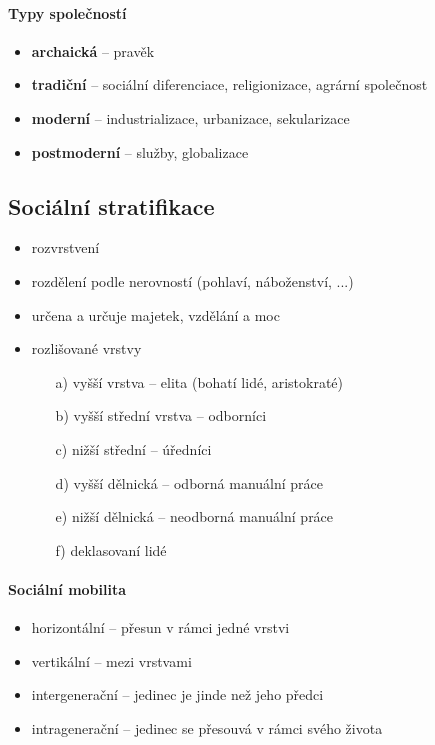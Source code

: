 \paragraph{Typy společností}
\begin{itemize}
\item \textbf{archaická} -- pravěk
\item \textbf{tradiční} -- sociální diferenciace, religionizace, agrární společnost
\item \textbf{moderní} -- industrializace, urbanizace, sekularizace
\item \textbf{postmoderní} -- služby, globalizace
\end{itemize}

\subsection{Sociální stratifikace}
\begin{itemize}
\item rozvrstvení
\item rozdělení podle nerovností (pohlaví, náboženství, ...)
\item určena a určuje majetek, vzdělání a moc
\item rozlišované vrstvy
	\begin{itemize}
	\item[a)] vyšší vrstva -- elita (bohatí lidé, aristokraté)
	\item[b)] vyšší střední vrstva -- odborníci
	\item[c)] nižší střední -- úředníci
	\item[d)] vyšší dělnická -- odborná manuální práce
	\item[e)] nižší dělnická -- neodborná manuální práce
	\item[f)] deklasovaní lidé
	\end{itemize}
\end{itemize}

\paragraph{Sociální mobilita}
\begin{itemize}
\item horizontální -- přesun v rámci jedné vrstvi
\item vertikální -- mezi vrstvami
\item intergenerační -- jedinec je jinde než jeho předci
\item intragenerační -- jedinec se přesouvá v rámci svého života
\end{itemize}

